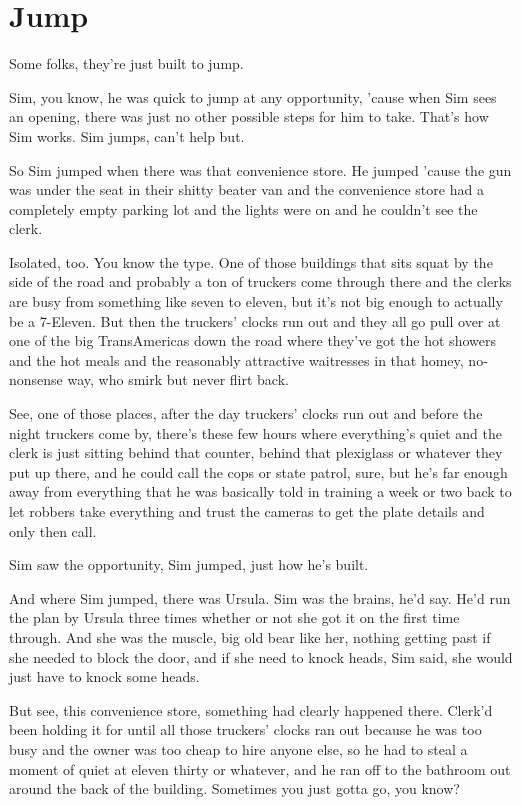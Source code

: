 \chapter{Jump}

Some folks, they're just built to jump.

Sim, you know, he was quick to jump at any opportunity, 'cause when Sim sees an opening, there was just no other possible steps for him to take. That's how Sim works. Sim jumps, can't help but.

So Sim jumped when there was that convenience store. He jumped 'cause the gun was under the seat in their shitty beater van and the convenience store had a completely empty parking lot and the lights were on and he couldn't see the clerk.

Isolated, too. You know the type. One of those buildings that sits squat by the side of the road and probably a ton of truckers come through there and the clerks are busy from something like seven to eleven, but it's not big enough to actually be a 7-Eleven. But then the truckers' clocks run out and they all go pull over at one of the big TransAmericas down the road where they've got the hot showers and the hot meals and the reasonably attractive waitresses in that homey, no-nonsense way, who smirk but never flirt back.

See, one of those places, after the day truckers' clocks run out and before the night truckers come by, there's these few hours where everything's quiet and the clerk is just sitting behind that counter, behind that plexiglass or whatever they put up there, and he could call the cops or state patrol, sure, but he's far enough away from everything that he was basically told in training a week or two back to let robbers take everything and trust the cameras to get the plate details and only then call.

Sim saw the opportunity, Sim jumped, just how he's built.

And where Sim jumped, there was Ursula. Sim was the brains, he'd say. He'd run the plan by Ursula three times whether or not she got it on the first time through. And she was the muscle, big old bear like her, nothing getting past if she needed to block the door, and if she need to knock heads, Sim said, she would just have to knock some heads.

But see, this convenience store, something had clearly happened there. Clerk'd been holding it for until all those truckers' clocks ran out because he was too busy and the owner was too cheap to hire anyone else, so he had to steal a moment of quiet at eleven thirty or whatever, and he ran off to the bathroom out around the back of the building. Sometimes you just gotta go, you know?

